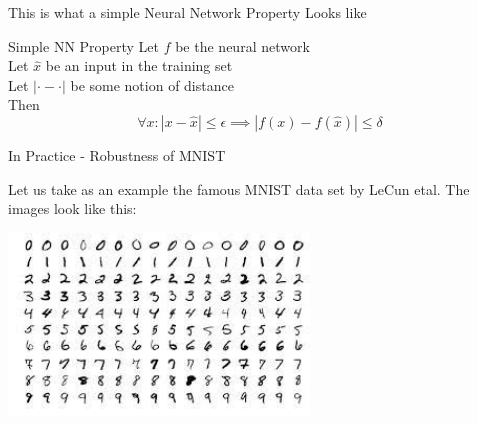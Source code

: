 \documentclass[t,compress,aspectratio=169]{beamer}
\begin{document}
\begin{frame}{This is what a simple Neural Network Property Looks like}

\Large
\begin{block}{Simple NN Property}
Let $f$ be the neural network\\
Let $\hat{x}$ be an input in the training set \\
Let \texttt{$|\cdot - \cdot |$} be some notion of distance\\

Then \[\forall x : | x - \hat{x}| \leq \epsilon \implies | f(x) - f(\hat{x})| \leq \delta\]

\end{block}


\end{frame}

\begin{frame}{In Practice - Robustness of MNIST}

    Let us take as an example the famous MNIST data set by LeCun etal. The images look like this:

    \centering
    \includegraphics[width=0.6\textwidth]{img/MNIST.jpeg}


\end{frame}

\end{document}
